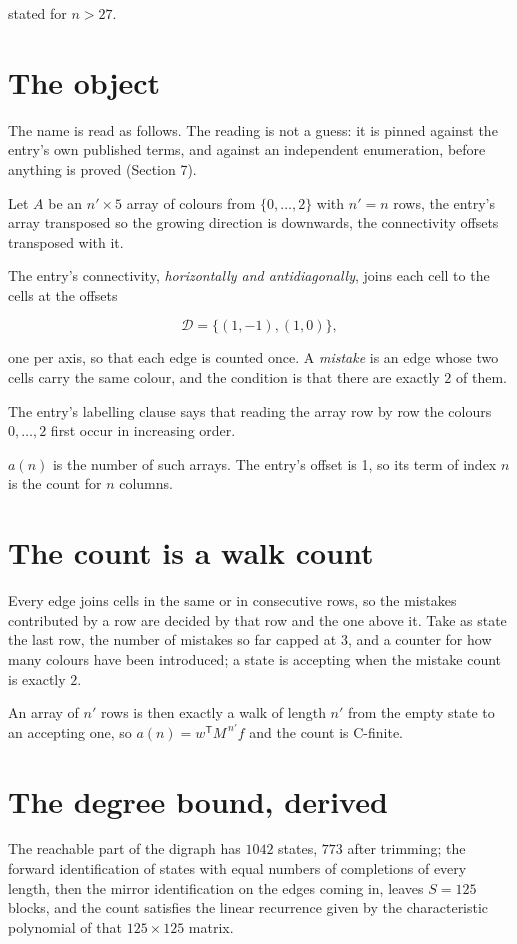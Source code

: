 \documentclass[11pt]{article}
\theoremstyle{definition}
\begin{document}
stated for $n > 27$.

\section{The object}

The name is read as follows. The reading is not a guess: it is pinned against the entry's own published terms, and against an independent enumeration, before anything is proved (Section 7).

Let $A$ be an $n' \times 5$ array of colours from $\{0,\dots,2\}$ with $n' = n$ rows, the entry's array transposed so the growing direction is downwards, the connectivity offsets transposed with it.

The entry's connectivity, {\itshape horizontally and antidiagonally}, joins each cell to the cells at the offsets

\[\mathcal{D} = \{(1,-1), (1,0)\},\]

one per axis, so that each edge is counted once. A {\itshape mistake} is an edge whose two cells carry the same colour, and the condition is that there are exactly $2$ of them.

The entry's labelling clause says that reading the array row by row the colours $0,\dots,2$ first occur in increasing order.

$a(n)$ is the number of such arrays. The entry's offset is 1, so its term of index $n$ is the count for $n$ columns.

\section{The count is a walk count}

Every edge joins cells in the same or in consecutive rows, so the mistakes contributed by a row are decided by that row and the one above it. Take as state the last row, the number of mistakes so far capped at $3$, and a counter for how many colours have been introduced; a state is accepting when the mistake count is exactly $2$.

An array of $n'$ rows is then exactly a walk of length $n'$ from the empty state to an accepting one, so $a(n) = w^{\mathsf T}M^{\,n'}f$ and the count is C-finite.

\section{The degree bound, derived}

The reachable part of the digraph has $1042$ states, $773$ after trimming; the forward identification of states with equal numbers of completions of every length, then the mirror identification on the edges coming in, leaves $S = 125$ blocks, and the count satisfies the linear recurrence given by the characteristic polynomial of that $125\times125$ matrix.
\end{document}
